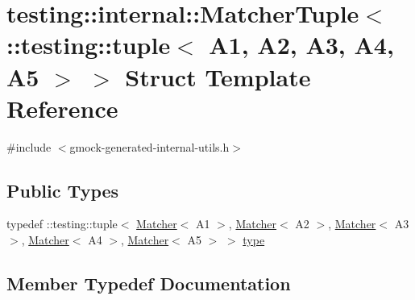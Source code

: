 \hypertarget{structtesting_1_1internal_1_1_matcher_tuple_3_01_1_1testing_1_1tuple_3_01_a1_00_01_a2_00_01_a3_00_01_a4_00_01_a5_01_4_01_4}{}\section{testing\+::internal\+::Matcher\+Tuple$<$ \+::testing\+::tuple$<$ A1, A2, A3, A4, A5 $>$ $>$ Struct Template Reference}
\label{structtesting_1_1internal_1_1_matcher_tuple_3_01_1_1testing_1_1tuple_3_01_a1_00_01_a2_00_01_a3_00_01_a4_00_01_a5_01_4_01_4}


{\ttfamily \#include $<$gmock-\/generated-\/internal-\/utils.\+h$>$}

\subsection*{Public Types}
\begin{DoxyCompactItemize}
\item 
typedef \+::testing\+::tuple$<$ \mbox{\hyperlink{classtesting_1_1_matcher}{Matcher}}$<$ A1 $>$, \mbox{\hyperlink{classtesting_1_1_matcher}{Matcher}}$<$ A2 $>$, \mbox{\hyperlink{classtesting_1_1_matcher}{Matcher}}$<$ A3 $>$, \mbox{\hyperlink{classtesting_1_1_matcher}{Matcher}}$<$ A4 $>$, \mbox{\hyperlink{classtesting_1_1_matcher}{Matcher}}$<$ A5 $>$ $>$ \mbox{\hyperlink{structtesting_1_1internal_1_1_matcher_tuple_3_01_1_1testing_1_1tuple_3_01_a1_00_01_a2_00_01_a3_00_01_a4_00_01_a5_01_4_01_4_a3c6f888e9aee4d15d4b5821eeff658d4}{type}}
\end{DoxyCompactItemize}


\subsection{Member Typedef Documentation}
\mbox{\label{structtesting_1_1internal_1_1_matcher_tuple_3_01_1_1testing_1_1tuple_3_01_a1_00_01_a2_00_01_a3_00_01_a4_00_01_a5_01_4_01_4_a3c6f888e9aee4d15d4b5821eeff658d4}} 

